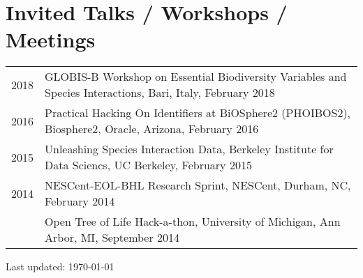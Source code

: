 \documentclass[11pt,fullpage]{article}
\begin{document}


\section*{Invited Talks / Workshops / Meetings}

\begin{longtable}{p{0.5in}|p{5.5in}}

 

 2018 
 & GLOBIS-B Workshop on Essential Biodiversity Variables and Species Interactions, Bari, Italy, February 2018 \\ 

 2016 &  Practical Hacking On Identifiers at BiOSphere2 (PHOIBOS2), Biosphere2, Oracle, Arizona, February 2016 \\
 
 2015 &  Unleashing Species Interaction Data, Berkeley Institute for Data Sciencs, UC Berkeley, February 2015 \\

 2014 & NESCent-EOL-BHL Research Sprint, NESCent, Durham, NC, February 2014 \\ 
  & Open Tree of Life Hack-a-thon, University of Michigan, Ann Arbor, MI, September 2014 \\ 

\end{longtable}






\bigskip
\begin{center}
  \begin{footnotesize}
    Last updated: \today
  \end{footnotesize}
\end{center}

\end{document}
